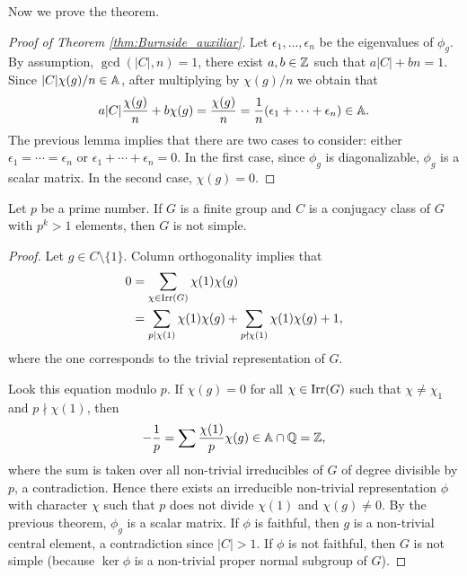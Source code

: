 Now we prove the theorem.

\begin{proof}[Proof of Theorem \ref{thm:Burnside_auxiliar}]
	Let $\epsilon_1,\dots,\epsilon_n$ be the eigenvalues of $\phi_g$. By assumption, 
	$\gcd(|C|,n)=1$, there exist $a,b\in\mathbb{Z}$ such that $a|C|+bn=1$. Since 
	$|C|\chi(g)/n\in\mathbb{A}$, after multiplying by $\chi(g)/n$ we obtain that  
	\[
		a|C|\frac{\chi(g)}{n}+b\chi(g)=\frac{\chi(g)}{n}=\frac{1}{n}(\epsilon_1+\cdots+\epsilon_n)\in\mathbb{A}.
	\]
	The previous lemma implies that there are two cases to consider: 
	either $\epsilon_1=\cdots=\epsilon_n$ or $\epsilon_1+\cdots+\epsilon_n=0$. In the first
	case, since $\phi_g$ is diagonalizable, $\phi_g$ is a scalar matrix. 
	In the second case, $\chi(g)=0$.
\end{proof}

\begin{theorem}[Burnside]
	Let $p$ be a prime number. If $G$ is a finite group and 
	$C$ is a conjugacy class of $G$ with $p^k>1$ elements, then $G$ 
	is not simple.
\end{theorem}

\begin{proof}
	Let $g\in C\setminus\{1\}$. Column orthogonality implies that 
	\begin{equation}
	\label{eq:Burnside}
	\begin{aligned}
		0&=\sum_{\chi\in\operatorname{Irr}(G)}\chi(1)\chi(g)\\
		&=\sum_{p\mid\chi(1)}\chi(1)\chi(g)+\sum_{p\nmid\chi(1)}\chi(1)\chi(g)+1,
	\end{aligned}
	\end{equation}
	where the one corresponds to the trivial representation of
	$G$.
	
	Look this equation modulo $p$. If $\chi(g)=0$ for all
	$\chi\in\operatorname{Irr}(G)$
	such that $\chi\ne\chi_1$ and $p\nmid\chi(1)$, then
	\[
	-\frac{1}{p}=\sum\frac{\chi(1)}{p}\chi(g)\in\mathbb{A}\cap\mathbb{Q}=\mathbb{Z},
	\]
	where the sum is taken over all non-trivial irreducibles
	of $G$ of degree divisible by $p$, a contradiction. Hence 
	there exists an irreducible non-trivial representation 
	$\phi$ with character $\chi$ such that $p$ does not divide
	$\chi(1)$ and $\chi(g)\ne0$. By the previous theorem, 
	$\phi_g$ is a scalar matrix. If $\phi$ is faithful, then 
	$g$ is a non-trivial central element, a contradiction since 
    $|C|>1$. If $\phi$ is not faithful, then 
    $G$ is not simple (because 
	$\ker\phi$ is a non-trivial proper normal subgroup of $G$). 
\end{proof}

